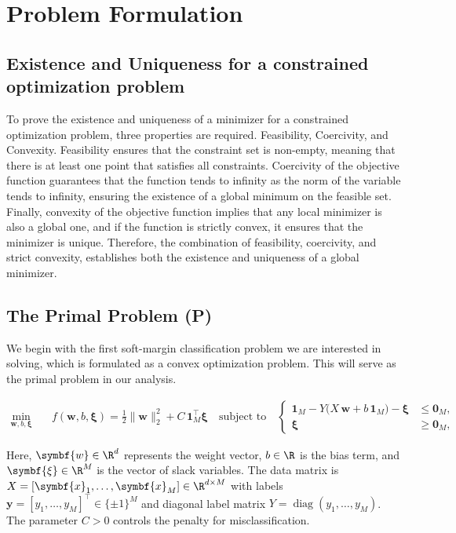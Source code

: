 \section{Problem Formulation}\label{chap:problem}
\subsection{Existence and Uniqueness for a constrained optimization problem}
To prove the existence and uniqueness of a minimizer for a constrained optimization problem,
three properties are required. Feasibility, Coercivity, and Convexity. Feasibility ensures that the constraint set is non-empty, meaning
that there is at least one point that satisfies all constraints. Coercivity of the objective
function guarantees that the function tends to infinity as the norm of the variable tends to infinity,
ensuring the existence of a global minimum on the feasible set. Finally, convexity of the objective
function implies that any local minimizer is also a global one, and if the function is strictly convex,
it ensures that the minimizer is unique. Therefore, the combination of feasibility, coercivity, and
strict convexity, establishes both the existence and uniqueness of a global minimizer.

\subsection{The Primal Problem (P)}
We begin with the first soft-margin classification problem we are interested in solving, which is
formulated as a convex optimization problem. This will serve as the primal problem in our analysis.

\begin{align*}\label{eq:primal-problem}
	\min_{\symbf{w}, b, \symbf{\xi}} \quad
	 & f(\symbf{w}, b, \symbf{\xi})
	= \frac{1}{2}\|\symbf{w}\|_2^2 + C\,\symbf{1}_M^\top \symbf{\xi}
	\quad
	\text{subject to}
	\quad
	\begin{cases}
		\symbf{1}_M - Y\bigl(X\,\symbf{w} + b\,\symbf{1}_M\bigr) - \symbf{\xi} & \le \symbf{0}_M, \\[6pt]
		\symbf{\xi} \;\;                                                       & \ge \symbf{0}_M,
	\end{cases}\tag{P}
\end{align*}

Here, $\symbf{w} \in \R^d$ represents the weight vector, $b \in \R$ is the bias term, and $\symbf{\xi} \in \R^M$ is the vector of slack variables.
The data matrix is $X = [\symbf{x}_1, \ldots, \symbf{x}_M] \in \R^{d \times M}$ with labels $\symbf{y}=[y_1, \ldots, y_M]^\top \in \{\pm1\}^M$ and diagonal label matrix $Y = \operatorname{diag}(y_1,\ldots,y_M)$.
The parameter $C>0$ controls the penalty for misclassification.

